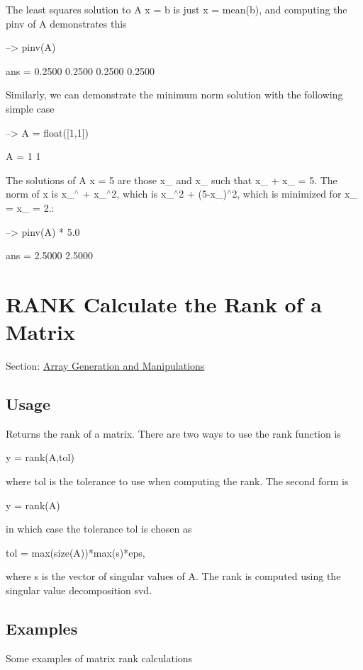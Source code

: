 The least squares solution to {\ttfamily A x = b} is just {\ttfamily x = mean(b)}, and computing the {\ttfamily pinv} of {\ttfamily A} demonstrates this


\begin{DoxyVerbInclude}
--> pinv(A)

ans = 
    0.2500    0.2500    0.2500    0.2500 
\end{DoxyVerbInclude}


Similarly, we can demonstrate the minimum norm solution with the following simple case


\begin{DoxyVerbInclude}
--> A = float([1,1])

A = 
 1 1 
\end{DoxyVerbInclude}


The solutions of {\ttfamily A x = 5} are those {\ttfamily x\-\_} and {\ttfamily x\-\_} such that {\ttfamily x\-\_ + x\-\_ = 5}. The norm of {\ttfamily x} is {\ttfamily x\-\_$^\wedge$ + x\-\_$^\wedge$2}, which is {\ttfamily x\-\_$^\wedge$2 + (5-\/x\-\_)$^\wedge$2}, which is minimized for {\ttfamily x\-\_ = x\-\_ = 2.}\-:


\begin{DoxyVerbInclude}
--> pinv(A) * 5.0

ans = 
    2.5000 
    2.5000 
\end{DoxyVerbInclude}
 \hypertarget{array_rank}{}\section{R\-A\-N\-K Calculate the Rank of a Matrix}\label{array_rank}
Section\-: \hyperlink{sec_array}{Array Generation and Manipulations} \hypertarget{vtkwidgets_vtkxyplotwidget_Usage}{}\subsection{Usage}\label{vtkwidgets_vtkxyplotwidget_Usage}
Returns the rank of a matrix. There are two ways to use the {\ttfamily rank} function is \begin{DoxyVerb}   y = rank(A,tol)
\end{DoxyVerb}
 where {\ttfamily tol} is the tolerance to use when computing the rank. The second form is \begin{DoxyVerb}   y = rank(A)
\end{DoxyVerb}
 in which case the tolerance {\ttfamily tol} is chosen as \begin{DoxyVerb}   tol = max(size(A))*max(s)*eps,
\end{DoxyVerb}
 where {\ttfamily s} is the vector of singular values of {\ttfamily A}. The rank is computed using the singular value decomposition {\ttfamily svd}. \hypertarget{variables_matrix_Examples}{}\subsection{Examples}\label{variables_matrix_Examples}
Some examples of matrix rank calculations


